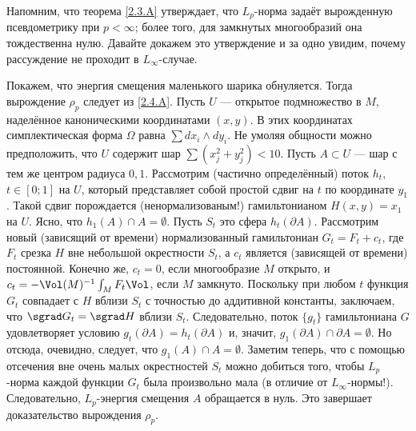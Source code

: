 

Напомним, что теорема \ref{2.3.A} утверждает, что $L_p$-норма задаёт вырожденную псевдометрику при $p <\infty$;
более того, для замкнутых многообразий она тождественна нулю.
Давайте докажем это утверждение и за одно увидим, почему рассуждение не проходит в $L_\infty$-случае.

Покажем, что энергия смещения маленького шарика обнуляется.
Тогда вырождение $\rho_p$ следует из \ref{2.4.A}.
Пусть $U$ --- открытое подмножество в $M$, наделённое каноническими координатами $(x, y)$.
В этих координатах симплектическая форма $\Omega$ равна $\sum dx_i\wedge dy_i$.
Не умоляя общности можно предположить, что $U$ содержит шар $\sum(x^2_j + y_j^2) <10$.
Пусть $A \subset U$ --- шар с тем же центром радиуса $0{,}1$.
Рассмотрим (частично определённый) поток $h_t$, $t \in [0; 1]$ на $U$, который представляет собой простой сдвиг на $t$ по координате $y_1$.
Такой сдвиг порождается (ненормализованым!) гамильтонианом $H (x, y) = x_1$ на $U$.
Ясно, что $h_1 (A) \cap A = \emptyset$.
Пусть $S_t$ это сфера $h_t (\partial A)$.
Рассмотрим новый (зависящий от времени) нормализованный гамильтониан
$G_t = F_t + c_t$, где $F_t$ срезка $H$ вне небольшой окрестности $S_t$, а $c_t$ является (зависящей от времени) постоянной.
Конечно же, $c_t = 0$, если многообразие $M$ открыто, и $c_t = -\Vol(M)^{-1}\int_M F_t \Vol$, если $M$ замкнуто.
Поскольку при любом $t$ функция $G_t$ совпадает с $H$ вблизи $S_t$ с точностью до аддитивной константы, заключаем, что $\sgrad G_t = \sgrad H$ вблизи $S_t$.
Следовательно, поток $\{g_t\}$ гамильтониана $G$ удовлетворяет условию $g_t (\partial A) = h_t (\partial A)$ и, значит, $g_1 (\partial A) \cap \partial A = \emptyset$.
Но отсюда, очевидно, следует, что $g_1 (A) \cap A = \emptyset$.
Заметим теперь, что с помощью отсечения вне очень малых окрестностей $S_t$ можно добиться того, чтобы $L_p$-норма каждой функции $G_t$ была произвольно мала (в отличие от $L_\infty$-нормы!).
Следовательно, $L_p$-энергия смещения $A$ обращается в нуль.
Это завершает доказательство вырождения $\rho_p$.

